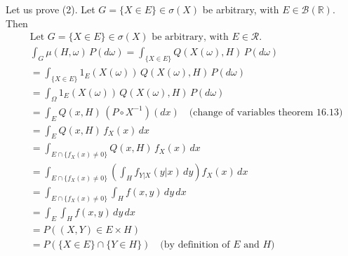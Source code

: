 Let us prove (2). Let \(G = \{X \in E\} \in \sigma(X)\) be arbitrary, with \(E \in \mathcal{B}(\mathbb{R})\). Then
\[
\begin{aligned}
    &\text{Let } G = \{X \in E\} \in \sigma(X) \text{ be arbitrary, with } E \in \mathcal{R}. \\
    &\int_{G} \mu(H, \omega) \, P(d\omega) = \int_{\{X \in E\}} Q(X(\omega), H) \, P(d\omega) \\
    &= \int_{\{X \in E\}} 1_E(X(\omega)) \, Q(X(\omega), H) \, P(d\omega) \\
    &= \int_{\Omega} 1_E(X(\omega)) \, Q(X(\omega), H) \, P(d\omega) \\
    &= \int_{E} Q(x, H) \, (P \circ X^{-1})(dx) \quad \text{(change of variables theorem 16.13)} \\
    &= \int_{E} Q(x, H) \, f_X(x) \, dx \\
    &= \int_{E \cap \{f_X(x) \neq 0\}} Q(x, H) \, f_X(x) \, dx \\
    &= \int_{E \cap \{f_X(x) \neq 0\}} \left( \int_{H} f_{Y|X}(y|x) \, dy \right) f_X(x) \, dx \\
    &= \int_{E \cap \{f_X(x) \neq 0\}} \int_{H} f(x, y) \, dy \, dx \\
    &= \int_{E} \int_{H} f(x, y) \, dy \, dx \\
    &= P((X, Y) \in E \times H) \\
    &= P(\{X \in E\} \cap \{Y \in H\}) \quad \text{(by definition of } E \text{ and } H) \\
\end{aligned}
\]
